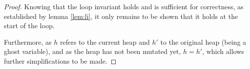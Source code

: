 \begin{proof}
  Knowing that the loop invariant holds and is sufficient for
  correctness, as established by lemma \ref{lem:li}, it only remains
  to be shown that it holds at the start of the loop.

  \begin{prooftree}
  \end{prooftree}

Furthermore, as $h$ refers to the current heap and $h'$ to the
original heap (being a ghost variable), and as the heap has not been
mutated yet, $h = h'$, which allows further simplifications to be made.


\end{proof}
